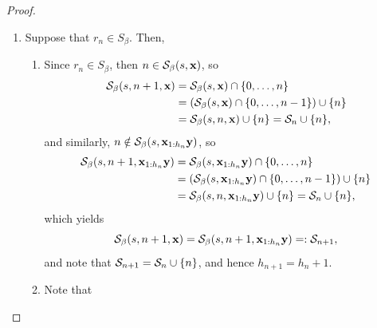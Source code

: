 \begin{proof}
\begin{enumerate}[label = (\alph*)]
\begin{enumerate}[label=(\roman*)]
                \begin{equation}
                    r_{n+1} := \pi_1 K_\beta^{n+1}(s,\xf) = \pi_1 K_\beta^{n+1}(s,\xf_{1:h_n}\yf),
                \end{equation}
                and note that $r_{n+1} = \beta r_n - b$.
                \item Since $r_n \notin S_\beta$, then 
                \begin{equation}
                    \pi_2 K_\beta^{n+1}(s,\xf) = \pi_2 K_\beta(r_n, \sigma^{h_n}(\xf)) = \sigma^{h_n}(\xf) = \sigma^{h_{n+1}}(\xf).
                \end{equation}
            \end{enumerate}
                \item Suppose that $r_n \in S_\beta$. Then,
                \begin{enumerate}[label=(\roman*)]
                    \item Since $r_n \in S_\beta$, then $n \in \mathcal{S}_\beta(s,{\bf x})$, so
                    \begin{align}
                        \mathcal{S}_\beta(s,n+1,{\bf x}) &= \mathcal{S}_\beta(s,{\bf x}) \cap \{0, \ldots, n\}\\
                        & =  \left(\mathcal{S}_\beta(s,{\bf x}) \cap \{0, \ldots, n-1\}\right) \cup \{n\}\\
                        & = \mathcal{S}_\beta(s,n,{\bf x}) \cup \{n\} = \mathcal{S}_n \cup \{n\},
                    \end{align}
                    and similarly, $n \notin \mathcal{S}_\beta(s,{\bf x}_{1:h_n}{\bf y})$, so
                    \begin{align}
                        \mathcal{S}_\beta(s,n+1,{\bf x}_{1:h_n}{\bf y}) &= \mathcal{S}_\beta(s,{\bf x}_{1:h_n}{\bf y}) \cap \{0, \ldots, n\}\\
                        & =  \left(\mathcal{S}_\beta(s,{\bf x}_{1:h_n}{\bf y}) \cap \{0, \ldots, n-1\} \right) \cup \{n\}\\
                        & = \mathcal{S}_\beta(s,n,{\bf x}_{1:h_n}{\bf y}) \cup \{n\} = \mathcal{S}_n \cup \{n\},
                    \end{align}
                    which yields
                    \begin{equation}
                        \mathcal{S}_\beta(s,n+1,{\bf x}) = \mathcal{S}_\beta(s,n+1,{\bf x}_{1:h_n}{\bf y}) =: \mathcal{S}_{n+1},
                    \end{equation}
                    and note that $\mathcal{S}_{n+1} = \mathcal{S}_n \cup \{n\}$, and hence $h_{n+1} = h_n + 1$.
                    \item Note that

\end{enumerate}
\end{enumerate}
\end{proof}
